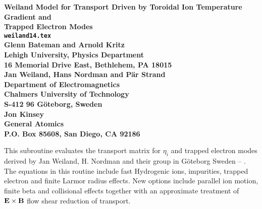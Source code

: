 \headheight 0pt \headsep 0pt          
\topmargin 0pt  \textheight 9.0in
\oddsidemargin 0pt \textwidth 6.5in

\newcommand{\Partial}[2]{\frac{\partial #1}{\partial #2}}
\newcommand{\jacobian}{{\cal J}}



\begin{center} 
{\bf 
Weiland Model for Transport Driven by
Toroidal Ion Temperature Gradient and \\
Trapped Electron Modes  \\
{\tt weiland14.tex} \\
\vspace{1pc}
Glenn Bateman and Arnold Kritz \\
Lehigh University, Physics Department \\
16 Memorial Drive East, Bethlehem, PA 18015 \\
\vspace{1pc}
Jan Weiland, Hans Nordman and P{\"a}r Strand\\
Department of Electromagnetics \\
Chalmers University of Technology \\
S-412 96 G\"{o}teborg, Sweden \\
\vspace{1pc}
Jon Kinsey \\
General Atomics \\
P.O. Box 85608, San Diego, CA 92186} \\ 
\vspace{1pc}
\end{center}
This subroutine evaluates the transport matrix for $\eta_i$ and trapped 
electron modes derived by Jan Weiland, H. Nordman and their group in 
G\"{o}teborg Sweden \cite{bate98a} -- \cite{jarm87a}.
The equations in this routine include fast Hydrogenic ions, impurities, 
trapped electron and finite Larmor radius effects. New options include 
parallel ion motion, finite beta and collisional effects together with an 
approximate treatment of ${\bf E}\times {\bf B}$ flow shear reduction of 
transport.

